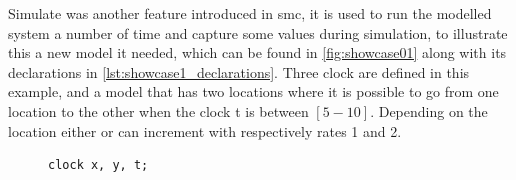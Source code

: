 \begin{table}[]
	\centering
	\caption{Results from Pr[<=1](<> Process.L4) with different parameter settings}
	\label{table:smc_result}
\end{table}

Simulate was another feature introduced in \gls{smc}, it is used to run the modelled system a number of time and capture some values during simulation, to illustrate this a new model it needed, which can be found in \cref{fig:showcase01} along with its declarations in \cref{lst:showcase1_declarations}. Three clock are defined in this example, and a model that has two locations where it is possible to go from one location to the other when the clock t is between $[5-10]$. Depending on the location either  or  can increment with respectively rates 1 and 2.

\begin{figure}
	\begin{lstlisting}[language=my_c, caption={Declarations}, label=lst:showcase1_declarations]
	clock x, y, t;
	\end{lstlisting}
\end{figure}

